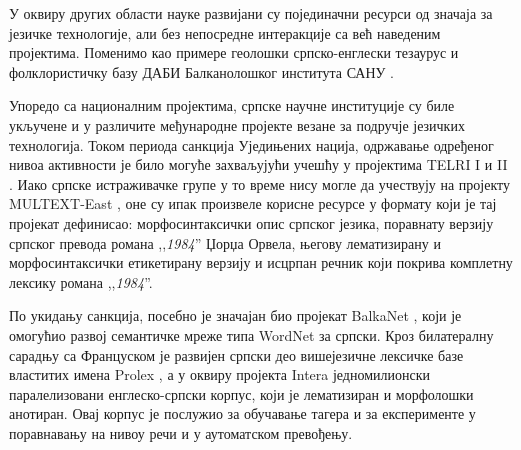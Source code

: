 \begin{multicols}{2}
У оквиру других области науке развијани су појединачни ресурси од значаја за језичке технологије, али без непосредне интеракције са већ наведеним пројектима. Поменимо као примере геолошки српско-енглески тезаурус \cite{RGF} и фолклористичку базу ДАБИ Балканолошког института САНУ  \cite{BALKANINSTITUT}.

Упоредо са националним пројектима, српске научне институције су биле укључене и у различите међународне пројекте везане за подручје језичких технологија. Током периода санкција Уједињених нација, одржавање одређеног нивоа активности је било могуће захваљујући учешћу у пројектима TELRI I и II \cite{TELRI}. Иако српске истраживачке групе у то време нису могле да учествују на пројекту MULTEXT-East \cite{NL}, оне су ипак произвеле корисне ресурсе у формату који је тај пројекат дефинисао: морфосинтаксички опис српског језика, поравнату верзију српског превода романа ,,\textit{1984}'' Џорџа Орвела, његову лематизирану и морфосинтаксички етикетирану верзију и исцрпан речник који покрива комплетну лексику романа ,,\textit{1984}''. 


По укидању санкција, посебно је значајан био пројекат BalkaNet \cite{CORDIS}, који је омогућио развој семантичке мреже типа WordNet за српски. Кроз билатералну сарадњу са Француском је развијен српски део вишејезичне лексичке базе властитих имена Prolex \cite{CNRTL}, а у оквиру пројекта Intera једномилионски паралелизовани енглеско-српски корпус, који је лематизиран и морфолошки анотиран. Овај корпус је послужио за обучавање тагера и за експерименте у поравнавању на нивоу речи и у аутоматском превођењу.


\end{multicols}
